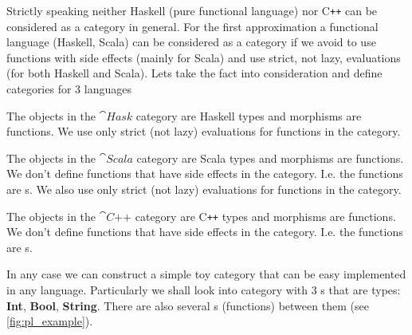 Strictly speaking neither Haskell (pure functional language) nor C\texttt{++}
can be considered as a category in general. For the first approximation
a functional language (Haskell, Scala) can be considered as a
category if we avoid to use functions with side effects (mainly for
Scala) and use strict, not lazy, evaluations (for both Haskell and
Scala). Lets take the fact into consideration and define categories for 3
languages 

\begin{definition}
\label{def:haskcategory}
The objects in the $\cat{Hask}$ category are Haskell types and
morphisms are functions. We use only strict (not lazy) evaluations for
functions in the category.
\end{definition}

\begin{definition}
\label{def:scalacategory}
The objects in the $\cat{Scala}$ category are Scala types and
morphisms are functions. We don't define functions that have side effects
in the category. I.e. the functions are
s. 
We also use only strict (not lazy) evaluations for
functions in the category.
\end{definition}

\begin{definition}
\label{def:cppcategory}
The objects in the $\cat{C\texttt{++}}$ category are C\texttt{++}
types and morphisms are functions. We don't define functions that have
side effects in the category. I.e. the functions are
s.  
\end{definition}


In any case we can construct a simple toy category that can be easy
implemented in any language. Particularly we shall look into category
with 3 s that are types: \textbf{Int}, \textbf{Bool},
\textbf{String}. There are also several s
(functions) between them (see \cref{fig:pl_example}).    

